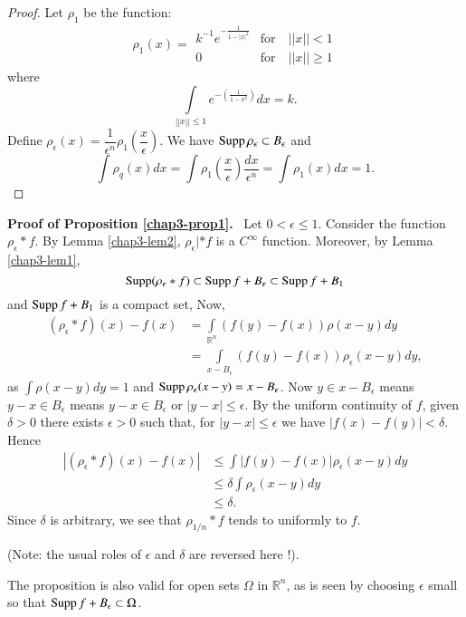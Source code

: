 \begin{proof}
Let $\rho_{1}$ be the function:
$$
\rho_{1}(x)=
\begin{matrix}
k^{-1}e^{-\frac{1}{1-|x|^{2}}} & \text{for}\quad ||x||<1\\[3pt]
0 & \text{for}\quad ||x||\geq 1
\end{matrix}
$$
where\pageoriginale
$$
\int\limits_{||x||\leq 1}e^{-\left(\frac{1}{1-x^{2}}\right)}dx=k.
$$
Define $\rho_{\epsilon}(x)=\dfrac{1}{\epsilon^{n}}\rho_{1}\left(\dfrac{x}{\epsilon}\right)$. We have $\operatorname{Supp} \rho_{\epsilon}\subset B_{\epsilon}$ and
$$
\int \rho_{q}(x)dx=\int \rho_{1}\left(\frac{x}{\epsilon}\right)\dfrac{dx}{\epsilon^{n}}=\int \rho_{1}(x)dx=1.
$$
\end{proof}

\noindent
{\bf Proof of Proposition \ref{chap3-prop1}.}~ Let $0<\epsilon \leq 1$. Consider the function $\rho_{\epsilon}\ast f$. By Lemma \ref{chap3-lem2}, $\rho_{\epsilon}|\ast f$ is a $C^{\infty}$ function. Moreover, by Lemma \ref{chap3-lem1},
$$
\operatorname{Supp} (\rho_{\epsilon}\ast f)\subset \operatorname{Supp} f+B_{\epsilon}\subset \operatorname{Supp} f+B_{1}
$$
and $\operatorname{Supp} f+B_{1}$ is a compact set, Now,
\begin{align*}
(\rho_{\epsilon}\ast f)(x)-f(x) &= \int\limits_{\mathbb{R}^{n}}(f(y)-f(x))\rho (x-y)dy\\[4pt]
&= \int\limits_{x-B_{\epsilon}}(f(y)-f(x))\rho_{\epsilon}(x-y)dy,
\end{align*}
as $\int \rho (x-y)dy=1$ and $\operatorname{Supp} \rho_{\epsilon}(x-y)=x-B_{\epsilon}$. Now $y\in x-B_{\epsilon}$ means $y-x\in B_{\epsilon}$ means $y-x\in B_{\epsilon}$ or $|y-x|\leq \epsilon$. By the uniform continuity of $f$, given $\delta > 0$ there exists $\epsilon>0$ such that, for $|y-x|\leq \epsilon$ we have $\left|f(x)-f(y)\right|<\delta$. Hence
\begin{align*}
\left| (\rho_{\epsilon}\ast f)(x)-f(x)\right| &\leq \int \left|f(y)-f(x)\right|\rho_{\epsilon}(x-y)dy\\[4pt]
&\leq \delta \int \rho_{\epsilon}(x-y)dy\\[4pt]
&\leq \delta.
\end{align*}
Since $\delta$ is arbitrary, we see that $\rho_{1/n}\ast f$ tends to uniformly to $f$. 

(Note: the usual roles of $\epsilon$ and $\delta$ are reversed here !).

\begin{remark*}
The proposition is also valid for open sets $\Omega$ in $\mathbb{R}^{n}$, as is seen by choosing $\epsilon$ small so that $\operatorname{Supp} f+B_{\epsilon}\subset \Omega$.
\end{remark*}

